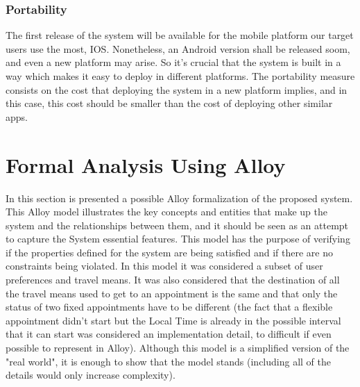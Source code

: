 \documentclass[12pt]{article}
\begin{document}
\subsubsection{Portability}
The first release of the system will be available for the mobile platform our target users use the most, IOS. Nonetheless, an Android version shall be released soom, and even a new platform may arise. So it's crucial that the system is built in a way which makes it easy to deploy in different platforms. The portability measure consists on the cost that deploying the system in a new platform implies, and in this case, this cost should be smaller than the cost of deploying other similar apps.

\section{Formal Analysis Using Alloy}
In this section is presented a possible Alloy formalization of the proposed system. This Alloy model illustrates the key concepts and entities that make up the system and the relationships between them, and it should be seen as an attempt to capture the System essential features.
This model has the purpose of verifying if the properties defined for the system are being satisfied and if there are no constraints being violated.
In this model it was considered a subset of user preferences and travel means. It was also considered that the destination of all the travel means used to get to an appointment is the same and that only the status of two fixed appointments have to be different (the fact that a flexible appointment didn't start but the Local Time is already in the possible interval that it can start was considered an implementation detail, to difficult if even possible to represent in Alloy). Although this model is a simplified version of the "real world", it is enough to show that the model stands (including all of the details would only increase complexity). 
\end{document}
